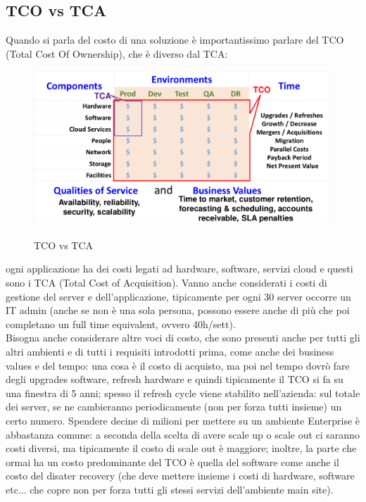 \documentclass{article}
\begin{document}
\subsection{TCO vs TCA}
Quando si parla del costo di una soluzione è importantissimo parlare del TCO (Total Cost Of Ownership), che è diverso dal TCA:\\
\begin{figure}[h]
\includegraphics[scale=0.2]{images/TCO-TCA.png}\\
\caption{TCO vs TCA}
\end{figure} 
ogni applicazione ha dei costi legati ad hardware, software, servizi cloud e questi sono i TCA (Total Cost of Acquisition). Vanno anche considerati i costi di gestione del server e dell'applicazione, tipicamente per ogni 30 server occorre un IT admin (anche se non è una sola persona, possono essere anche di più che poi completano un full time equivalent, ovvero 40h/sett).\\ Bisogna anche considerare altre voci di costo, che sono presenti anche per tutti gli altri ambienti e di tutti i requisiti introdotti prima, come anche dei business values e del tempo: una cosa è il costo di acquisto, ma poi nel tempo dovrò fare degli upgrades software, refresh hardware e quindi tipicamente il TCO si fa su una finestra di 5 anni; spesso il refresh cycle viene stabilito nell'azienda: sul totale dei server, se ne cambieranno periodicamente (non per forza tutti insieme) un certo numero. Spendere decine di milioni per mettere su un ambiente Enterprise è abbastanza comune: a seconda della scelta di avere scale up o scale out ci saranno costi diversi, ma tipicamente il costo di scale out è maggiore; inoltre, la parte che ormai ha un costo predominante del TCO è quella del software come anche il costo del disater recovery (che deve mettere insieme i costi di hardware, software etc... che copre non per forza tutti gli stessi servizi dell'ambiente main site).
\end{document}
